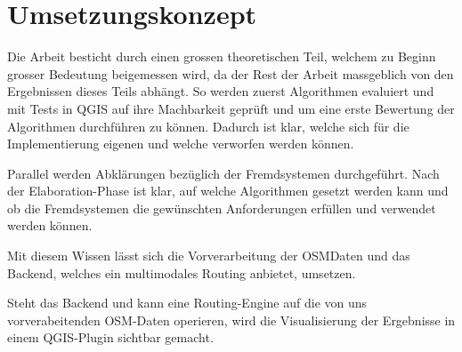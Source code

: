 \section{Umsetzungskonzept}
\label{sec:Umsetzungskonzept}

Die Arbeit besticht durch einen grossen theoretischen Teil, welchem zu Beginn grosser Bedeutung beigemessen wird, da der Rest der Arbeit massgeblich von den Ergebnissen dieses Teils abhängt. So werden zuerst Algorithmen evaluiert und mit Tests in QGIS auf ihre Machbarkeit geprüft und um eine erste Bewertung der Algorithmen durchführen zu können. Dadurch ist klar, welche sich für die Implementierung eigenen und welche verworfen werden können.

Parallel werden Abklärungen bezüglich der Fremdsystemen durchgeführt. Nach der Elaboration-Phase ist klar, auf welche Algorithmen gesetzt werden kann und ob die Fremdsystemen die gewünschten Anforderungen erfüllen und verwendet werden können.

Mit diesem Wissen lässt sich die Vorverarbeitung der \ac{OSM}Daten und das Backend, welches ein multimodales Routing anbietet, umsetzen.

Steht das Backend und kann eine Routing-Engine auf die von uns vorverabeitenden \ac{OSM}-Daten operieren, wird die Visualisierung der Ergebnisse in einem QGIS-Plugin sichtbar gemacht.
